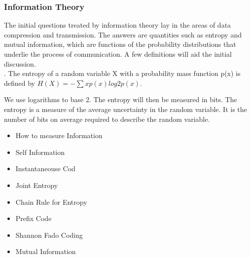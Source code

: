 \begin{frame}
\frametitle{Information Theory}
The initial questions treated by information theory lay in the
areas of data compression and transmission. The answers are
quantities such as entropy and mutual information, which are
functions of the probability distributions that underlie the
process of communication. A few definitions will aid the initial
discussion. \\. The entropy
of a random variable X with a probability mass function p(x) is
defined by $H(X) = -\sum x p(x) log2 p(x)$. 
\end{frame}
\begin{frame}
We use logarithms to base 2. The entropy will then be measured in
bits. The entropy is a measure of the average uncertainty in the
random variable. It is the number of bits on average required to
describe the random variable.
\end{frame}
\begin{frame}
\begin{itemize}
\item How to measure Information
\item Self Information
\item Instantaneouse Cod
\item Joint Entropy
\item Chain Rule for Entropy
\item Prefix Code
\item Shannon Fado Coding
\item Mutual Information
\end{itemize}
\end{frame}

